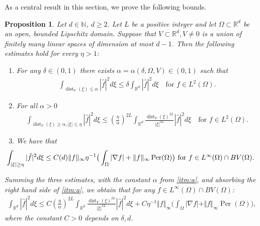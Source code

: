 \documentclass[a4paper, 10pt, twoside, notitlepage]{amsart}
\theoremstyle{plain}
\newtheorem{prop}{Proposition}[section]
\newcommand{\R}{\mathbb{R}}
\newcommand{\N}{\mathbb{N}}
\DeclareMathOperator{\dist}{dist}
\DeclareMathOperator{\Per}{Per}
\begin{document}
		
		As a central result in this section, we prove the following bounds.
		\begin{prop}\label{prop:key_estimate}
			Let $d \in \N$, $d \geq 2$. Let $L$ be a positive integer and let $\Omega \subset \R^d$ be an open, bounded Lipschitz domain. Suppose that $V\subset\R^d, V \neq 0$ is a union of finitely many linear spaces of dimension at most $d-1$. Then the following estimates hold for every $\eta > 1$:
			\renewcommand{\labelenumi}{\textbf{\theenumi}} \renewcommand{\theenumi}{(\roman{enumi})}
			\begin{enumerate}
				\item\label{itm:a} For any $\delta \in (0,1)$ there exists $\alpha  = \alpha(\delta,\Omega,V) \in (0,1)$ such that
				\begin{align*}
				\int_{\dist_V(\xi)\leq \alpha} |\hat f|^2 d\xi \leq \delta \int_{\R^d} |\hat f|^2d\xi \quad\text{for }f\in L^2(\Omega).
                                \end{align*}
                              \item\label{itm:b} For all $\alpha>0$
				\begin{align*}
				\int_{\dist_V(\xi)\geq \alpha,|\xi|\leq \eta}|\hat f|^2 d\xi \leq \left(\frac{\eta}{\alpha}\right)^{2L}\int_{\R^d}\frac{\dist_V(\xi)^{2L}}{{|\xi|}^{2L}}|\hat f|^2d\xi\quad\text{for
				}f\in L^2(\Omega).
                                \end{align*}
                              \item\label{itm:c} We have that
                                \begin{align*}
				\hspace{-19pt} \int_{|\xi|\geq\eta}|\hat f|^2 d\xi\leq C(d) \Vert f \Vert_\infty \eta^{-1} \big(\int_\Omega|\nabla f|+\Vert f \Vert_{\infty} \Per(\Omega)\big) \text{ for }f\in L^{\infty}(\Omega)\cap BV(\Omega).
                                \end{align*}
                              \end{enumerate}
			Summing the three estimates, with the constant $\alpha$ from \cref{itm:a}, and absorbing the right hand side of \cref{itm:a}, we obtain that for any  $f\in L^{\infty}(\Omega)\cap BV(\Omega)$:
			\begin{align*}
			\int_{\R^d}|\hat f|^2 d\xi\leq C \left(\frac{\eta}{\alpha}\right)^{2L}\int_{\R^d}\frac{\dist_V(\xi)^{2L}}{{|\xi|}^{2L}}|\hat f|^2d\xi+C\eta^{-1} \Vert f \Vert_\infty\big(\int_\Omega|\nabla
			f|+\Vert f \Vert_\infty \Per(\Omega)\big),
			\end{align*}
			where the constant $C>0$ depends on $\delta,d$.
		\end{prop}
		
\end{document}
